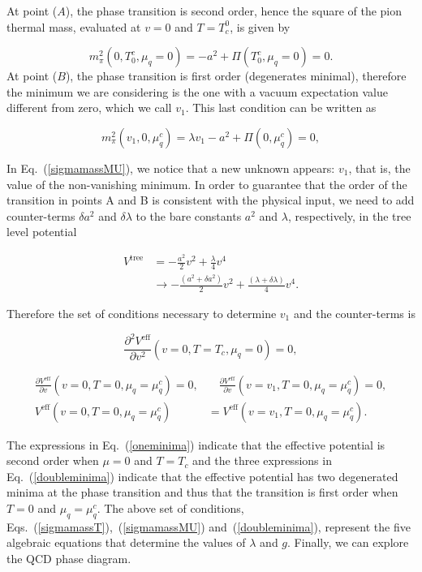 \documentclass[%
 reprint,
showpacs,preprintnumbers,
 amsmath,amssymb,
onecolumn]{revtex4}
\begin{document}
At point ($A$), the phase transition is second order, hence the square of the pion thermal mass, evaluated at $v=0$ and $T=T_c^0$, is given by

\begin{equation}
 m_\pi^2(0,T^c_0,\mu_q=0)=-a^2+\Pi(T^c_0,\mu_q=0)=0.
 \label{sigmamassT}
\end{equation}
At point ($B$), the phase transition is first order (degenerates minimal), therefore the minimum we are considering is the one with a vacuum expectation value different from zero, which we call $v_1$. This last condition can be written as

\begin{equation}
 m_\pi^2(v_1,0,\mu_q^c)=\lambda v_1-a^2+\Pi(0,\mu_q^c)=0,
 \label{sigmamassMU}
\end{equation}

In Eq.~(\ref{sigmamassMU}), we notice that a new unknown appears: $v_1$, that is, the value of the non-vanishing minimum. In order to guarantee that the order of the transition in points A and B is consistent with the physical input, we need to add counter-terms $\delta a^2$ and $\delta \lambda$ to the bare constants $a^2$ and $\lambda$, respectively, in the tree level potential 

\begin{align}
	V^{\text{tree}}&=-\frac{a^2}{2}v^2+\frac{\lambda}{4}v^4 \nonumber \\
    &\rightarrow -\frac{(a^2+\delta a^2)}{2}v^2+\frac{(\lambda+\delta \lambda)}{4}v^4.
    \label{newtree}
\end{align}


Therefore the set of conditions necessary to determine $v_1$ and the counter-terms is

\begin{equation}
 \frac{\partial^2 V^{\text{eff}}}{\partial v^2}(v=0,T=T_c,\mu_q=0)=0,
\label{oneminima}
\end{equation}

\begin{align}
 \frac{\partial V^{\text{eff}}}{\partial v}(v=0,T=0,\mu_q=\mu_q^c)=0,&\quad\frac{\partial V^{\text{eff}}}{\partial v}(v=v_1,T=0,\mu_q=\mu_q^c)=0, \nonumber \\
 V^{\text{eff}}(v=0,T=0,\mu_q=\mu_q^c)&=V^{\text{eff}}(v=v_1,T=0,\mu_q=\mu_q^c).
 \label{doubleminima}
\end{align}

The expressions in Eq.~(\ref{oneminima}) indicate that the effective potential is second order when $\mu = 0$ and $T = T_c$ and the three expressions in Eq.~(\ref{doubleminima}) indicate that the effective potential has two degenerated minima at the phase transition and thus that the transition is first order when $T=0$ and $\mu_q=\mu_q^c$. The above set of conditions, Eqs.~(\ref{sigmamassT}),~(\ref{sigmamassMU}) and~(\ref{doubleminima}), represent the five algebraic equations that determine the values of $\lambda$ and $g$. Finally, we can explore the QCD phase diagram.
\end{document}
